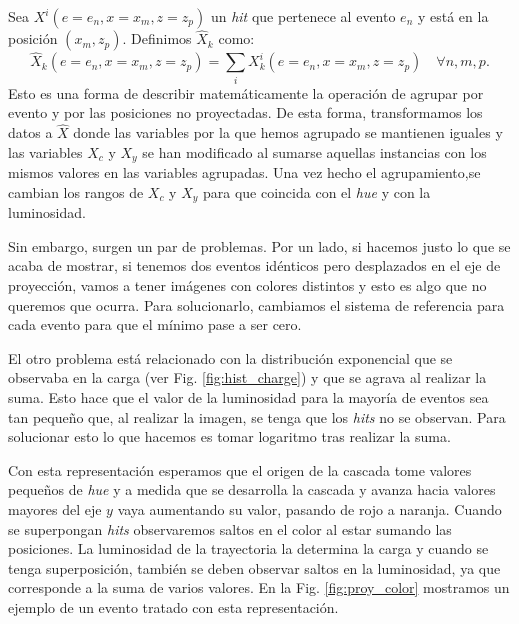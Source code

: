 \documentclass[a4paper,12pt,oneside,titlepage]{book}
\begin{document}
Sea $X^i\left(e = e_n, x=x_m, z=z_p\right)$ un \textit{hit} que pertenece al evento $e_n$ y está en la posición $(x_m, z_p)$. Definimos $\hat{X}_k$ como:
\begin{equation}
  \hat{X}_k\left(e = e_n, x=x_m, z=z_p\right) = \sum_i X^i_k\left(e = e_n, x=x_m, z=z_p\right) \quad \forall n, m, p.
\end{equation}
Esto es una forma de describir matemáticamente la operación de agrupar por evento y por las posiciones no proyectadas. De esta forma, transformamos los datos a $\hat{X}$ donde las variables por la que hemos agrupado se mantienen iguales y las variables $X_c$ y $X_y$ se han modificado al sumarse aquellas instancias con los mismos valores en las variables agrupadas. Una vez hecho el agrupamiento,se cambian los rangos de $X_c$ y $X_y$ para que coincida con el \textit{hue} y con la luminosidad.

Sin embargo, surgen un par de problemas. Por un lado, si hacemos justo lo que se acaba de mostrar, si tenemos dos eventos idénticos pero desplazados en el eje de proyección, vamos a tener imágenes con colores distintos y esto es algo que no queremos que ocurra. Para solucionarlo, cambiamos el sistema de referencia para cada evento para que el mínimo pase a ser cero.

El otro problema está relacionado con la distribución exponencial que se observaba en la carga (ver Fig. \ref{fig:hist_charge}) y que se agrava al realizar la suma. Esto hace que el valor de la luminosidad para la mayoría de eventos sea tan pequeño que, al realizar la imagen, se tenga que los \textit{hits} no se observan. Para solucionar esto lo que hacemos es tomar logaritmo tras realizar la suma.

Con esta representación esperamos que el origen de la cascada tome valores pequeños de \textit{hue} y a medida que se desarrolla la cascada y avanza hacia valores mayores del eje $y$ vaya aumentando su valor, pasando de rojo a naranja. Cuando se superpongan \textit{hits} observaremos saltos en el color al estar sumando las posiciones. La luminosidad de la trayectoria la determina la carga y cuando se tenga superposición, también se deben observar saltos en la luminosidad, ya que corresponde a la suma de varios valores. En la Fig. \ref{fig:proy_color} mostramos un ejemplo de un evento tratado con esta representación.
\end{document}
